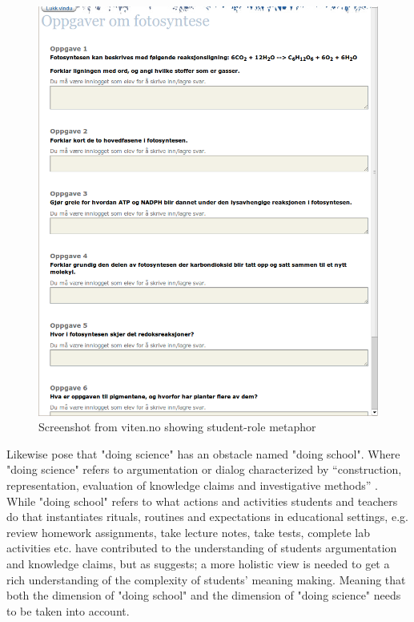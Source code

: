 \begin{figure}
\centering
\includegraphics[width=1\textwidth]{img/theoretical/vitenassessment.png}
\caption{Screenshot from viten.no showing student-role metaphor}
\label{fig:scrshotviten}
\end{figure}

Likewise \citet{jimenez2000doing} pose that "doing science" has an obstacle named "doing school". Where "doing science" refers to argumentation or dialog characterized by “construction, representation, evaluation of knowledge claims and investigative methods” \citep{jimenez2000doing}. While "doing school" refers to what actions and activities students and teachers do that instantiates rituals, routines and expectations in educational settings, e.g. review homework assignments, take lecture notes, take tests, complete lab activities etc. \citeauthor{jimenez2000doing} have contributed to the understanding of students argumentation and knowledge claims, but as \citet*{furberg2008students} suggests; a more holistic view is needed to get a rich understanding of the complexity of students' meaning making. Meaning that both the dimension of "doing school" and the dimension of "doing science" needs to be taken into account. 

